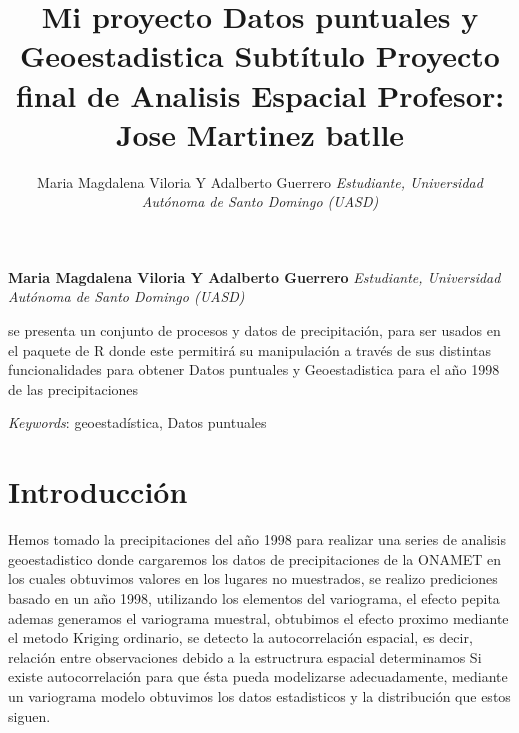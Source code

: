 \documentclass[11pt,]{article}
\title{\textbar{} Mi proyecto \textbar{}Datos puntuales y Geoestadistica
\textbar{} Subtítulo \textbar{}Proyecto final de Analisis Espacial
\textbar{} Profesor: \textbar{}Jose Martinez batlle  }
\author{\Large Maria Magdalena Viloria Y Adalberto Guerrero\vspace{0.05in} \newline\normalsize\emph{Estudiante, Universidad Autónoma de Santo Domingo (UASD)}  }
\date{}
\newcommand*{\authorfont}{\fontfamily{phv}\selectfont}
\renewenvironment{abstract}
 {{%
    \setlength{\leftmargin}{0mm}
    \setlength{\rightmargin}{\leftmargin}%
  }%
  \relax}
 {\endlist}
\begin{document}
	
%

{%
\setlength{\parindent}{0pt}
\thispagestyle{plain}
{\fontsize{18}{20}\selectfont\raggedright 
\maketitle  %

}

{
   \vskip 13.5pt\relax \normalsize\fontsize{11}{12} 
\textbf{\authorfont Maria Magdalena Viloria Y Adalberto Guerrero} \hskip 15pt \emph{\small Estudiante, Universidad Autónoma de Santo Domingo (UASD)}   

}

}








\begin{abstract}

    \hbox{\vrule height .2pt width 39.14pc}

    \vskip 8.5pt %

\noindent se presenta un conjunto de procesos y datos de precipitación, para ser
usados en el paquete de R donde este permitirá su manipulación a través
de sus distintas funcionalidades para obtener Datos puntuales y
Geoestadistica para el año 1998 de las precipitaciones


\vskip 8.5pt \noindent \emph{Keywords}: geoestadística, Datos puntuales \par

    \hbox{\vrule height .2pt width 39.14pc}



\end{abstract}


\vskip 6.5pt


\noindent  \section{Introducción}\label{introducciuxf3n}

Hemos tomado la precipitaciones del año 1998 para realizar una series de
analisis geoestadistico donde cargaremos los datos de precipitaciones de
la ONAMET en los cuales obtuvimos valores en los lugares no muestrados,
se realizo prediciones basado en un año 1998, utilizando los elementos
del variograma, el efecto pepita ademas generamos el variograma
muestral, obtubimos el efecto proximo mediante el metodo Kriging
ordinario, se detecto la autocorrelación espacial, es decir, relación
entre observaciones debido a la estructrura espacial determinamos Si
existe autocorrelación para que ésta pueda modelizarse adecuadamente,
mediante un variograma modelo obtuvimos los datos estadisticos y la
distribución que estos siguen.
\end{document}

